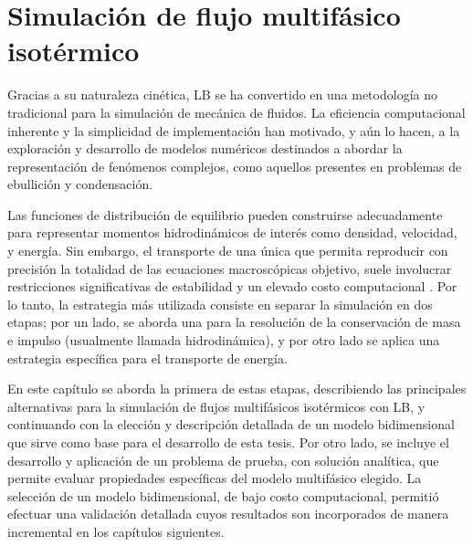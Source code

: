 \chapter{Simulaci\'on de flujo multif\'asico isot\'ermico}
\label{chap:isot}

Gracias a su naturaleza cin\'etica, LB se ha convertido en una metodolog\'ia no tradicional para la simulaci\'on de mec\'anica de fluidos. La eficiencia computacional inherente y la simplicidad de implementaci\'on han motivado, y a\'un lo hacen, a la exploraci\'on y desarrollo de modelos num\'ericos destinados a abordar la representaci\'on de fen\'omenos complejos, como aquellos presentes en problemas de ebullici\'on y condensaci\'on.

Las funciones de distribuci\'on de equilibrio pueden construirse adecuadamente para representar momentos hidrodin\'amicos de inter\'es como densidad, velocidad, y energ\'ia. Sin embargo, el transporte de una \'unica \fdp{} que permita reproducir con precisi\'on la totalidad de las ecuaciones macrosc\'opicas objetivo, suele involucrar restricciones significativas de estabilidad y un elevado costo computacional \cite{guo_lattice_2013}. Por lo tanto, la estrategia m\'as utilizada consiste en separar la simulaci\'on en dos etapas; por un lado, se aborda una \lbe{} para la resoluci\'on de la conservaci\'on de masa e impulso (usualmente llamada \lbe{} hidrodin\'amica), y por otro lado se aplica una estrategia espec\'ifica para el transporte de energ\'ia.

En este cap\'itulo se aborda la primera de estas etapas, describiendo las principales alternativas para la simulaci\'on de flujos multif\'asicos isot\'ermicos con LB, y continuando con la elecci\'on y descripci\'on detallada de un modelo bidimensional que sirve como base para el desarrollo de esta tesis. Por otro lado, se incluye el desarrollo y aplicaci\'on  de un problema de prueba, con soluci\'on anal\'itica, que permite evaluar propiedades espec\'ificas del modelo multif\'asico elegido. La selecci\'on de un modelo bidimensional, de bajo costo computacional, permiti\'o efectuar una validaci\'on detallada cuyos resultados son incorporados de manera incremental en los cap\'itulos siguientes.
\newpage

